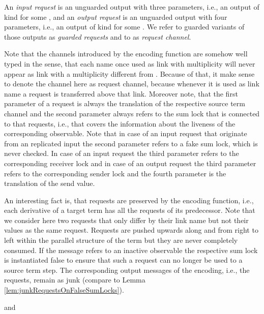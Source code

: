 \documentclass[]{llncs}
\begin{document}
\begin{definition}[Request] \label{def:request}
	An \emph{input request} is an unguarded output with three parameters, i.e., an output of kind  for some , and an \emph{output request} is an unguarded output with four parameters, i.e., an output of kind  for some . We refer to guarded variants of those outputs as \emph{guarded requests} and to  as \emph{request channel}.
\end{definition}
\noindent
Note that the channels introduced by the encoding function are somehow well typed in the sense, that each name once used as link with multiplicity  will never appear as link with a multiplicity different from . Because of that, it make sense to denote the channel  here as request channel, because whenever it is used as link name a request is transferred above that link. Moreover note, that the first parameter  of a request is always the translation of the respective source term channel and the second parameter  always refers to the sum lock that is connected to that requests, i.e., that covers the information about the liveness of the corresponding observable. Note that in case of an input request that originate from an replicated input the second parameter refers to a fake sum lock, which is never checked. In case of an input request the third parameter  refers to the corresponding receiver lock and in case of an output request the third parameter  refers to the corresponding sender lock and the fourth parameter  is the translation of the send value.

An interesting fact is, that requests are preserved by the encoding function, i.e., each derivative of a target term has all the requests of its predecessor. Note that we consider here two requests that only differ by their link name but not their values as the same request. Requests are pushed upwards along and from right to left within the parallel structure of the term but they are never completely consumed. If the message refers to an inactive observable the respective sum lock is instantiated false to ensure that such a request can no longer be used to \simulate a source term step. The corresponding output messages of the encoding, i.e., the requests, remain as junk (compare to Lemma \ref{lem:junkRequestsOnFalseSumLocks}).

\begin{lemma} \label{lem:encodingMixAsynPreserveRequests}
	
	and
	
\end{lemma}
\end{document}
